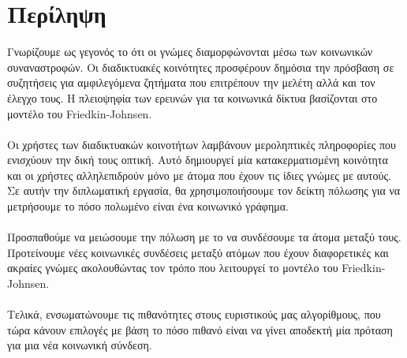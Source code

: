 \chapter*{Περίληψη}

\noindent Γνωρίζουμε ως γεγονός το ότι οι γνώμες διαμορφώνονται μέσω των κοινωνικών συναναστροφών. Οι διαδικτυακές κοινότητες προσφέρουν δημόσια την πρόσβαση σε συζητήσεις για αμφιλεγόμενα ζητήματα που επιτρέπουν την μελέτη αλλά και τον έλεγχο τους. Η πλειοψηφία των ερευνών για τα κοινωνικά δίκτυα βασίζονται στο μοντέλο του Friedkin-Johnsen.
\\
\\
Οι χρήστες των διαδικτυακών κοινοτήτων λαμβάνουν μεροληπτικές πληροφορίες που ενισχύουν την δική τους οπτική. Αυτό δημιουργεί μία κατακερματισμένη κοινότητα και οι χρήστες αλληλεπιδρούν μόνο με άτομα που έχουν τις ίδιες γνώμες με αυτούς. Σε αυτήν την διπλωματική εργασία, θα χρησιμοποιήσουμε τον δείκτη πόλωσης για να μετρήσουμε το πόσο πολωμένο είναι ένα κοινωνικό γράφημα.
\\
\\
Προσπαθούμε να μειώσουμε την πόλωση με το να συνδέσουμε τα άτομα μεταξύ τους. Προτείνουμε νέες κοινωνικές συνδέσεις μεταξύ ατόμων που έχουν διαφορετικές και ακραίες γνώμες ακολουθώντας τον τρόπο που λειτουργεί το μοντέλο του Friedkin-Johnsen.
\\
\\
Τελικά, ενσωματώνουμε τις πιθανότητες στους ευριστικούς μας αλγορίθμους, που τώρα κάνουν επιλογές με βάση το πόσο πιθανό είναι να γίνει αποδεκτή μία πρόταση για μια νέα κοινωνική σύνδεση.

\bigskip
